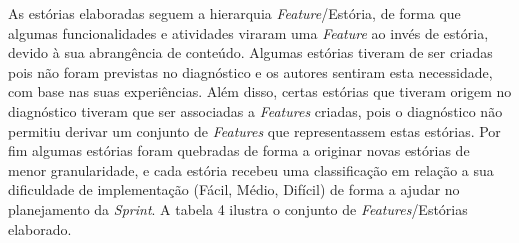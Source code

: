 As estórias elaboradas seguem a hierarquia \textit{Feature}/Estória, de forma que algumas funcionalidades e atividades viraram uma \textit{Feature} ao invés de estória, devido à sua abrangência de conteúdo. Algumas estórias tiveram de ser criadas pois não foram previstas no diagnóstico e os autores sentiram esta necessidade, com base nas suas experiências. Além disso, certas estórias que tiveram origem no diagnóstico tiveram que ser associadas a \textit{Features} criadas, pois o diagnóstico não permitiu derivar um conjunto de \textit{Features} que representassem estas estórias. Por fim algumas estórias foram quebradas de forma a originar novas estórias de menor granularidade, e cada estória recebeu uma classificação em relação a sua dificuldade de implementação (Fácil, Médio, Difícil) de forma a ajudar no planejamento da \textit{Sprint}. A tabela 4 ilustra o conjunto de \textit{Features}/Estórias elaborado. \clearpage

